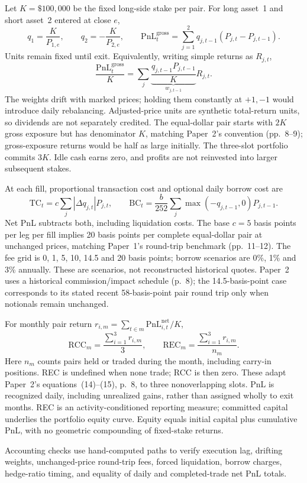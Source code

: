 Let $K=\$100{,}000$ be the fixed long-side stake per pair. For long asset~1 and
short asset~2 entered at close $e$,
\begin{equation}
 q_1=\frac{K}{P_{1,e}},\qquad q_2=-\frac{K}{P_{2,e}},\qquad
 \mathrm{PnL}^{\mathrm{gross}}_t=
 \sum_{j=1}^2q_{j,t-1}(P_{j,t}-P_{j,t-1}).
\end{equation}
Units remain fixed until exit. Equivalently, writing simple returns as $R_{j,t}$,
\begin{equation}
 \frac{\mathrm{PnL}^{\mathrm{gross}}_t}{K}
 =\sum_j\underbrace{\frac{q_{j,t-1}P_{j,t-1}}{K}}_{w_{j,t-1}}
 R_{j,t}.
\end{equation}
The weights drift with marked prices; holding them constantly at $+1,-1$
would introduce daily rebalancing. Adjusted-price units are synthetic total-return
units, so dividends are not separately credited. The equal-dollar pair starts
with $2K$ gross exposure but has denominator $K$, matching Paper~2's convention
(pp.~8--9); gross-exposure returns would be half as large initially. The three-slot
portfolio commits $3K$. Idle cash earns zero, and profits are not reinvested into
larger subsequent stakes.

At each fill, proportional transaction cost and optional daily borrow cost are
\begin{equation}
 \mathrm{TC}_t=c\sum_j|\Delta q_{j,t}|P_{j,t},\qquad
 \mathrm{BC}_t=\frac{b}{252}\sum_j\max(-q_{j,t-1},0)P_{j,t-1}.
\end{equation}
Net PnL subtracts both, including liquidation costs. The base $c=5$ basis
points per leg per fill implies 20 basis points per complete equal-dollar pair
at unchanged prices, matching Paper~1's round-trip benchmark (pp.~11--12).
The fee grid is 0, 1, 5, 10, 14.5 and 20 basis points; borrow scenarios are
0\%, 1\% and 3\% annually. These are scenarios, not reconstructed historical
quotes. Paper~2 uses a historical commission/impact schedule (p.~8); the
14.5-basis-point case corresponds to its stated recent 58-basis-point pair
round trip only when notionals remain unchanged.

For monthly pair return $r_{i,m}=\sum_{t\in m}\mathrm{PnL}^{\mathrm{net}}_{i,t}/K$,
\begin{equation}
 \mathrm{RCC}_m=\frac{\sum_{i=1}^3 r_{i,m}}{3},\qquad
 \mathrm{REC}_m=\frac{\sum_{i=1}^3r_{i,m}}{n_m}.
\end{equation}
Here $n_m$ counts pairs held or traded during the month, including carry-in
positions. REC is undefined when none trade; RCC is then zero. These adapt
Paper~2's equations~(14)--(15), p.~8, to three nonoverlapping slots. PnL is
recognized daily, including unrealized gains, rather than assigned wholly to
exit months. REC is an activity-conditioned reporting measure; committed capital
underlies the portfolio equity curve. Equity equals initial capital plus cumulative
PnL, with no geometric compounding of fixed-stake returns.

Accounting checks use hand-computed paths to verify execution lag, drifting
weights, unchanged-price round-trip fees, forced liquidation, borrow charges,
hedge-ratio timing, and equality of daily and completed-trade net PnL totals.
